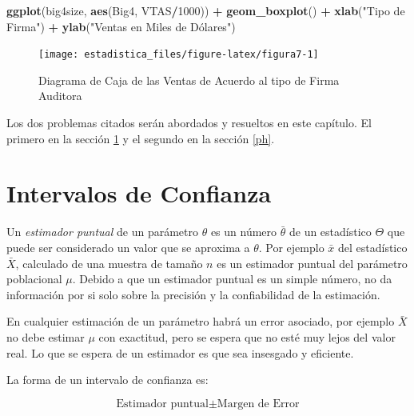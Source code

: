 \documentclass[]{book}
\newenvironment{Shaded}{\begin{snugshade}}{\end{snugshade}}
\newcommand{\DecValTok}[1]{\textcolor[rgb]{0.00,0.00,0.81}{#1}}
\newcommand{\KeywordTok}[1]{\textcolor[rgb]{0.13,0.29,0.53}{\textbf{#1}}}
\newcommand{\NormalTok}[1]{#1}
\newcommand{\OperatorTok}[1]{\textcolor[rgb]{0.81,0.36,0.00}{\textbf{#1}}}
\newcommand{\StringTok}[1]{\textcolor[rgb]{0.31,0.60,0.02}{#1}}
\begin{document}
\begin{Shaded}
\begin{Highlighting}[]
\KeywordTok{ggplot}\NormalTok{(big4size, }\KeywordTok{aes}\NormalTok{(Big4, VTAS}\OperatorTok{/}\DecValTok{1000}\NormalTok{)) }\OperatorTok{+}\StringTok{ }
\StringTok{  }\KeywordTok{geom_boxplot}\NormalTok{() }\OperatorTok{+}\StringTok{ }\KeywordTok{xlab}\NormalTok{(}\StringTok{"Tipo de Firma"}\NormalTok{) }\OperatorTok{+}
\StringTok{  }\KeywordTok{ylab}\NormalTok{(}\StringTok{"Ventas en Miles de Dólares")}
\end{Highlighting}
\end{Shaded}

\begin{figure}[h]

{\centering \texttt{[image: estadistica\_files/figure-latex/figura7-1]} 

}

\caption{Diagrama de Caja de las Ventas de Acuerdo al tipo de Firma Auditora}\label{fig:figura7}
\end{figure}

Los dos problemas citados serán abordados y resueltos en este capítulo. El primero en la sección \ref{ic} y el segundo en la sección \ref{ph}.

\hypertarget{ic}{%
\section{Intervalos de Confianza}\label{ic}}

Un \emph{estimador puntual} de un parámetro \(\theta\) es un número \(\bar{\theta}\) de un estadístico \(\Theta\) que puede ser considerado un valor que se aproxima a \(\theta\). Por ejemplo \(\bar{x}\) del estadístico \(\bar{X}\), calculado de una muestra de tamaño \(n\) es un estimador puntual del parámetro poblacional \(\mu\). Debido a que un estimador puntual es un simple número, no da información por si solo sobre la precisión y la confiabilidad de la estimación.

En cualquier estimación de un parámetro habrá un error asociado, por ejemplo \(\bar{X}\) no debe estimar \(\mu\) con exactitud, pero se espera que no esté muy lejos del valor real. Lo que se espera de un estimador es que sea insesgado y eficiente.

La forma de un intervalo de confianza es:

\begin{equation} 
  \text{Estimador puntual} \pm \text{Margen de Error}
  \label{eq:ic}
\end{equation}
\end{document}
